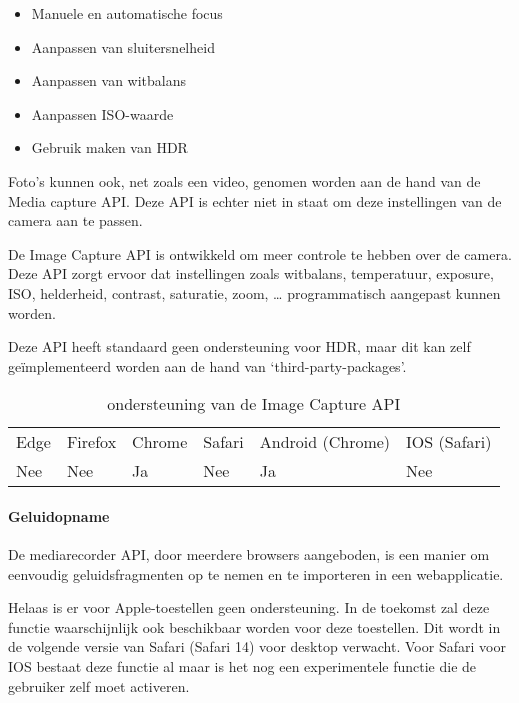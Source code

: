  \begin{itemize}
     \item Manuele en automatische focus
     \item Aanpassen van sluitersnelheid
     \item Aanpassen van witbalans
     \item Aanpassen ISO-waarde
     \item Gebruik maken van HDR 
   \end{itemize}

Foto’s kunnen ook, net zoals een video, genomen worden aan de hand van de Media capture API. Deze API is echter niet in staat om deze instellingen van de camera aan te passen.

De Image Capture API \autocite{Mandyam2020} is ontwikkeld om meer controle te hebben over de camera. Deze API zorgt ervoor dat instellingen zoals witbalans, temperatuur, exposure, ISO, helderheid, contrast, saturatie, zoom, … programmatisch aangepast kunnen worden.

Deze API heeft standaard geen ondersteuning voor HDR, maar dit kan zelf geïmplementeerd worden aan de hand van ‘third-party-packages’.

\autocite{Bhaumik2019}

\begin{table}[]
	\begin{tabular}{llllll}
		Edge & Firefox & Chrome & Safari & Android (Chrome) & IOS (Safari) \\
		Nee   & Nee      & Ja     & Nee     & Ja               & Nee          
	\end{tabular}	
	\caption{ondersteuning van de Image Capture API}
	\label{ondersteuning van de Image Capture API}
\end{table}



\paragraph{Geluidopname }

De mediarecorder API, \autocite{CasasSanchez2020} door meerdere browsers aangeboden, is een manier om eenvoudig geluidsfragmenten op te nemen en te importeren in een webapplicatie.

Helaas is er voor Apple-toestellen geen ondersteuning. In de toekomst zal deze functie waarschijnlijk ook beschikbaar worden voor deze toestellen. Dit wordt in de volgende versie van Safari (Safari 14) voor desktop verwacht. Voor Safari voor IOS bestaat deze functie al maar is het nog een experimentele functie die de gebruiker zelf moet activeren.


